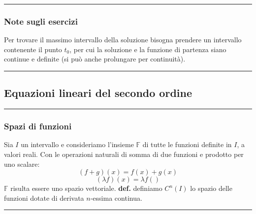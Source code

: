 \rule{\textwidth}{0,4pt}\newline
\begin{tcolorbox}
    \subsubsection*{Note sugli esercizi}
    Per trovare il massimo intervallo della soluzione bisogna prendere un intervallo contenente il punto $t_0$, per cui la soluzione e la funzione di partenza siano continue e definite (si può anche prolungare per continuità).\newline
\end{tcolorbox}
\rule{\textwidth}{2pt}
\subsection*{Equazioni lineari del secondo ordine}
\rule{\textwidth}{0,4pt}
\subsubsection*{Spazi di funzioni}
Sia $I$ un intervallo e consideriamo l'insieme $\mathbb{F}$ di tutte le funzioni definite in $I$, a valori reali. Con le operazioni naturali di somma di due funzioni e prodotto per uno scalare:
\[
    (f+g)(x) = f(x) + g(x)
\]
\[
    (\lambda f)(x) = \lambda f()
\]
$\mathbb{F}$ risulta essere uno spazio vettoriale. \newline
\newline
\textbf{def.} definiamo $C^n(I)$ lo spazio delle funzioni dotate di derivata $n$-essima continua.\newline
\rule{\textwidth}{0,4pt}
